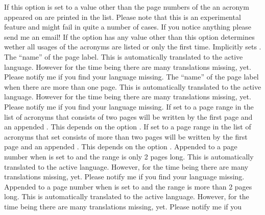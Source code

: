 \documentclass[load-preamble+]{cnltx-doc}
\begin{document}
\begin{options}
    If this option is set to a value other than  the page numbers
    of the an acronym appeared on are printed in the list.  Please note that
    this is an experimental feature and might fail in quite a number of cases.
    If you notice anything please send me an email!
    If the option  has any value other than
     this option determines wether all usages of the acronyms are
    listed or only the first time.  Implicitly sets .
    The ``name'' of the page label.  This is automatically translated to the
    active language. However for the time being there are many translations
    missing, yet.  Please notify me if you find your language missing.
    The ``name'' of the page label when there are more than
    one page.  This is automatically translated to the active language.
    However for the time being there are many translations missing, yet.
    Please notify me if you find your language missing.
    If set to  a page range in the list of
    acronyms that consists of two pages will be written by the first page and
    an appended . This depends on the option .
    If set to  a page range in the list of
    acronyms that set consists of more than two pages will be written by the
    first page and an appended . This depends on the option
    .
    Appended to a page number when 
    is set to  and the range is only 2 pages long.  This is
    automatically translated to the active language.  However, for the time
    being there are many translations missing, yet.  Please notify me if you
    find your language missing.
    Appended to a page number when 
    is set to  and the range is more than 2 pages long.  This is
    automatically translated to the active language.  However, for the time
    being there are many translations missing, yet.  Please notify me if you

\end{options}
\end{document}
